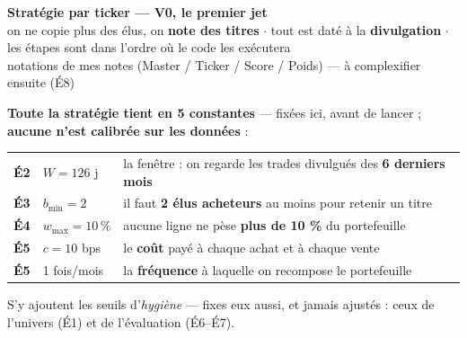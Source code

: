 \documentclass[11pt,a4paper]{article}
\begin{document}
\begin{center}
{\LARGE\bfseries Stratégie par ticker --- V0, le premier jet}\\[1mm]
{\normalsize on ne copie plus des élus, on \textbf{note des titres} $\cdot$ tout est daté à la \textbf{divulgation} $\cdot$
les étapes sont dans l'ordre où le code les exécutera}\\[0.5mm]
{\small\color{grisf} notations de mes notes (Master / Ticker / Score / Poids) --- à complexifier ensuite (É8)}
\end{center}

\vspace{1mm}
\begin{mdframed}[linecolor=grisf, backgroundcolor=grisf!6, linewidth=0.8pt, roundcorner=4pt]
\textbf{Toute la stratégie tient en 5 constantes} --- fixées ici, avant de lancer ; \textbf{aucune n'est calibrée sur les données} :
\vspace{1mm}
\begin{center}
\begin{tabular}{@{}r@{\;\;}l@{\qquad}l@{}}
\textbf{É2} & $W = 126$ j & la fenêtre : on regarde les trades divulgués des \textbf{6 derniers mois} \\
\textbf{É3} & $b_{\min} = 2$ & il faut \textbf{2 élus acheteurs} au moins pour retenir un titre \\
\textbf{É4} & $w_{\max} = 10\,\%$ & aucune ligne ne pèse \textbf{plus de 10 \%} du portefeuille \\
\textbf{É5} & $c = 10$ bps & le \textbf{coût} payé à chaque achat et à chaque vente \\
\textbf{É5} & 1 fois/mois & la \textbf{fréquence} à laquelle on recompose le portefeuille \\
\end{tabular}
\end{center}
\vspace{0.5mm}
{\small S'y ajoutent les seuils d'\emph{hygiène} --- fixes eux aussi, et jamais ajustés : ceux de l'univers (É1) et de l'évaluation (É6--É7).}
\end{mdframed}
\end{document}
